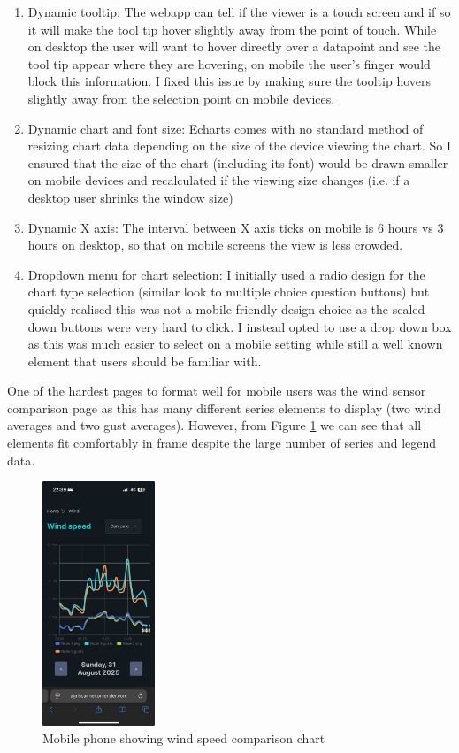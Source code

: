 \begin{enumerate}
    \item Dynamic tooltip: The webapp can tell if the viewer is a touch screen
          and if so it will make the tool tip hover slightly away from the point
          of touch. While on desktop the user will want to hover directly over a
          datapoint and see the tool tip appear where they are hovering, on
          mobile the user's finger would block this information. I fixed this
          issue by making sure the tooltip hovers slightly away from the
          selection point on mobile devices.
    \item Dynamic chart and font size: Echarts comes with no standard method of
          resizing chart data depending on the size of the device viewing the
          chart. So I ensured that the size of the chart (including its font)
          would be drawn smaller on mobile devices and recalculated if the
          viewing size changes (i.e. if a desktop user shrinks the window size)
    \item Dynamic X axis: The interval between X axis ticks on mobile is 6 hours
          vs 3 hours on desktop, so that on mobile screens the view is less
          crowded.
    \item Dropdown menu for chart selection: I initially used a radio design for
          the chart type selection (similar look to multiple choice question
          buttons) but quickly realised this was not a mobile friendly design
          choice as the scaled down buttons were very hard to click. I instead
          opted to use a drop down box as this was much easier to select on a
          mobile setting while still a well known element that users should be
          familiar with.
\end{enumerate}

One of the hardest pages to format well for mobile users was the wind sensor
comparison page as this has many different series elements to display (two
wind averages and two gust averages). However, from Figure \ref{fig:mobile-page}
we can see that all elements fit comfortably in frame despite the large number
of series and legend data.

\begin{figure}[H]
    \centering
    \includegraphics[width=0.3\textwidth]{contents/part-3/fig3/mobile-wind-speed-compare.jpeg}
    \caption{Mobile phone showing wind speed comparison chart}
    \label{fig:mobile-page}
\end{figure} 


